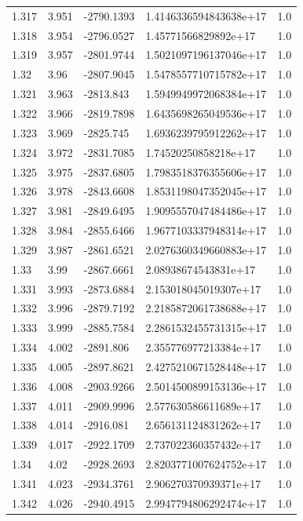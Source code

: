 \begin{tabular}{lllll}
1.317 & 3.951 & -2790.1393 & 1.4146336594843638e+17 & 1.0 \\
1.318 & 3.954 & -2796.0527 & 1.45771566829892e+17 & 1.0 \\
1.319 & 3.957 & -2801.9744 & 1.5021097196137046e+17 & 1.0 \\
1.32 & 3.96 & -2807.9045 & 1.5478557710715782e+17 & 1.0 \\
1.321 & 3.963 & -2813.843 & 1.5949949972068384e+17 & 1.0 \\
1.322 & 3.966 & -2819.7898 & 1.6435698265049536e+17 & 1.0 \\
1.323 & 3.969 & -2825.745 & 1.6936239795912262e+17 & 1.0 \\
1.324 & 3.972 & -2831.7085 & 1.74520250858218e+17 & 1.0 \\
1.325 & 3.975 & -2837.6805 & 1.7983518376355606e+17 & 1.0 \\
1.326 & 3.978 & -2843.6608 & 1.8531198047352045e+17 & 1.0 \\
1.327 & 3.981 & -2849.6495 & 1.9095557047484486e+17 & 1.0 \\
1.328 & 3.984 & -2855.6466 & 1.9677103337948314e+17 & 1.0 \\
1.329 & 3.987 & -2861.6521 & 2.0276360349660883e+17 & 1.0 \\
1.33 & 3.99 & -2867.6661 & 2.08938674543831e+17 & 1.0 \\
1.331 & 3.993 & -2873.6884 & 2.153018045019307e+17 & 1.0 \\
1.332 & 3.996 & -2879.7192 & 2.2185872061738688e+17 & 1.0 \\
1.333 & 3.999 & -2885.7584 & 2.2861532455731315e+17 & 1.0 \\
1.334 & 4.002 & -2891.806 & 2.355776977213384e+17 & 1.0 \\
1.335 & 4.005 & -2897.8621 & 2.4275210671528448e+17 & 1.0 \\
1.336 & 4.008 & -2903.9266 & 2.5014500899153136e+17 & 1.0 \\
1.337 & 4.011 & -2909.9996 & 2.577630586611689e+17 & 1.0 \\
1.338 & 4.014 & -2916.081 & 2.656131124831262e+17 & 1.0 \\
1.339 & 4.017 & -2922.1709 & 2.737022360357432e+17 & 1.0 \\
1.34 & 4.02 & -2928.2693 & 2.8203771007624752e+17 & 1.0 \\
1.341 & 4.023 & -2934.3761 & 2.906270370939371e+17 & 1.0 \\
1.342 & 4.026 & -2940.4915 & 2.9947794806292474e+17 & 1.0 \\

\end{tabular}
